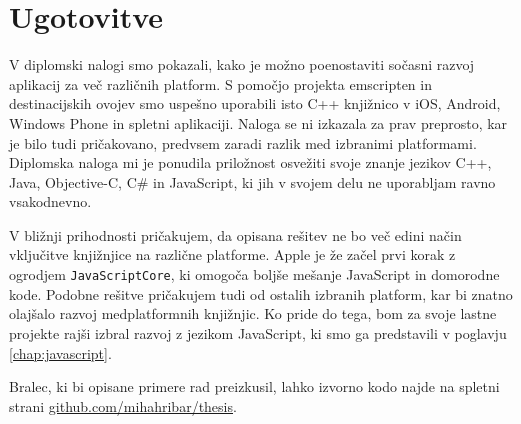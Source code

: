 








\chapter{Ugotovitve}
\label{chap:conclusion}

V diplomski nalogi smo pokazali, kako je možno poenostaviti sočasni razvoj aplikacij za več različnih platform. S pomočjo projekta emscripten in destinacijskih ovojev smo uspešno uporabili isto C++ knjižnico v iOS, Android, Windows Phone in spletni aplikaciji. Naloga se ni izkazala za prav preprosto, kar je bilo tudi pričakovano, predvsem zaradi razlik med izbranimi platformami. Diplomska naloga mi je ponudila priložnost osvežiti svoje znanje jezikov C++, Java, Objective-C, C\# in JavaScript, ki jih v svojem delu ne uporabljam ravno vsakodnevno.

V bližnji prihodnosti pričakujem, da opisana rešitev ne bo več edini način vključitve knjižnjice na različne platforme. Apple je že začel prvi korak z ogrodjem \texttt{JavaScriptCore}, ki omogoča boljše mešanje JavaScript in domorodne kode. Podobne rešitve pričakujem tudi od ostalih izbranih platform, kar bi znatno olajšalo razvoj medplatformnih knjižnjic. Ko pride do tega, bom za svoje lastne projekte rajši izbral razvoj z jezikom JavaScript, ki smo ga predstavili v poglavju \ref{chap:javascript}.

Bralec, ki bi opisane primere rad preizkusil, lahko izvorno kodo najde na spletni strani \href{https://github.com/mihahribar/thesis}{github.com/mihahribar/thesis}.